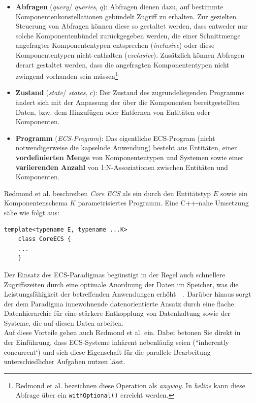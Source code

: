 \begin{itemize}
    \item \textbf{Abfragen} (\textit{query}/ \textit{queries}, $q$): Abfragen dienen dazu, auf bestimmte Komponentenkonstellationen gebündelt Zugriff zu erhalten.
    Zur gezielten Steuerung von Abfragen können diese so gestaltet werden, dass entweder nur solche Komponentenbündel zurückgegeben werden, die einer Schnittmenge angefragter Komponententypen entsprechen (\textit{inclusive}) oder diese Komponententypen nicht enthalten (\textit{exclusive}).
    Zusätzlich können Abfragen derart gestaltet werden, dass die angefragten Komponententypen nicht zwingend vorhanden sein müssen\footnote{
    Redmond et al. bezeichnen diese Operation als \textit{anyway}. In \textit{helios} kann diese Abfrage über ein \texttt{withOptional()} erreicht werden.
    }
    \item \textbf{Zustand} (\textit{state}/ \textit{states}, $c$): Der Zustand des zugrundeliegenden Programms ändert sich mit der Anpassung der über die Komponenten bereitgestellten Daten, {bzw.} dem Hinzufügen oder Entfernen von Entitäten oder Komponenten.
    \item \textbf{Programm} (\textit{ECS-Program}): Das eigentliche ECS-Program (nicht notwendigerweise die kapselnde Anwendung) besteht aus Entitäten, einer \textbf{vordefinierten Menge} von Komponententypen und Systemen sowie einer \textbf{variierenden Anzahl} von 1:N-Assoziationen zwischen Entitäten und Komponenten.
\end{itemize}

\begin{tcolorbox}[title={Core ECS als parametrisiertes Programm},colback=white]
    Redmond et al. beschreiben \textit{Core ECS} als ein durch den Entitätstyp $E$ sowie ein Komponentenschema $K$ parametrisiertes Programm.
    Eine C++-nahe Umsetzung sähe wie folgt aus:
    \vspace{2mm}
    \begin{lstlisting}[style=c++style,
        label=lst:statemapping]
    template<typename E, typename ...K>
    class CoreECS {
    ...
    }
    \end{lstlisting}
\end{tcolorbox}

Der Einsatz des ECS-Paradigmas begünstigt in der Regel auch schnellere Zugriffszeiten durch eine optimale Anordnung der Daten im Speicher, was die Leistungsfähigkeit der betreffenden Anwendungen erhöht~\cite{Fab18}~\cite{SRSS+23}.
Darüber hinaus sorgt der dem Paradigma innewohnende datenorientierte Ansatz durch eine flache Datenhierarchie für eine stärkere Entkopplung von Datenhaltung sowie der Systeme, die auf diesen Daten arbeiten.\\

Auf diese Vorteile gehen auch Redmond et al. ein.
Dabei betonen Sie direkt in der Einführung, dass ECS-Systeme inhärent nebenläufig seien (``inherently concurrent`) und sich diese Eigenschaft für die parallele Bearbeitung unterschiedlicher Aufgaben nutzen lässt.

